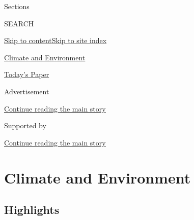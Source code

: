 Sections

SEARCH

\protect\hyperlink{site-content}{Skip to
content}\protect\hyperlink{site-index}{Skip to site index}

\href{https://www.nytimes.com/section/climate}{Climate and Environment}

\href{https://myaccount.nytimes.com/auth/login?response_type=cookie\&client_id=vi}{}

\href{https://www.nytimes.com/section/todayspaper}{Today's Paper}

Advertisement

\protect\hyperlink{after-top}{Continue reading the main story}

Supported by

\protect\hyperlink{after-sponsor}{Continue reading the main story}

\hypertarget{climate-and-environment}{%
\section{Climate and Environment}\label{climate-and-environment}}

\hypertarget{highlights}{%
\subsection{Highlights}\label{highlights}}

